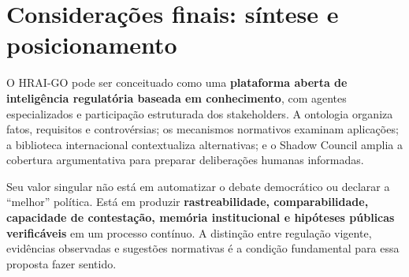 \documentclass[12pt,a4paper,oneside,english,brazil]{abntex2}
\begin{document}
\chapter{Considerações finais: síntese e posicionamento}
O HRAI-GO pode ser conceituado como uma \textbf{plataforma aberta de inteligência regulatória baseada em conhecimento}, com agentes especializados e participação estruturada dos stakeholders. A ontologia organiza fatos, requisitos e controvérsias; os mecanismos normativos examinam aplicações; a biblioteca internacional contextualiza alternativas; e o Shadow Council amplia a cobertura argumentativa para preparar deliberações humanas informadas.

Seu valor singular não está em automatizar o debate democrático ou declarar a ``melhor'' política. Está em produzir \textbf{rastreabilidade, comparabilidade, capacidade de contestação, memória institucional e hipóteses públicas verificáveis} em um processo contínuo. A distinção entre regulação vigente, evidências observadas e sugestões normativas é a condição fundamental para essa proposta fazer sentido.


\postextual

\end{document}
